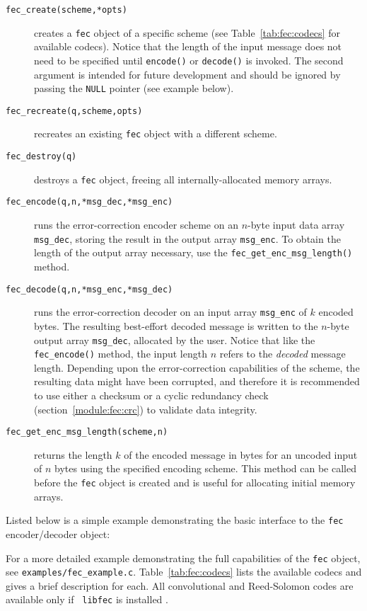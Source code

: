 \begin{description}
\item[{\tt fec\_create(scheme,*opts)}]
    creates a {\tt fec} object of a specific scheme
    (see Table~\ref{tab:fec:codecs} for available codecs).
    Notice that the length of the input message does not need to be
    specified until {\tt encode()} or {\tt decode()} is invoked.
    The second argument is intended for future development and should be
    ignored by passing the {\tt NULL} pointer
    (see example below).
\item[{\tt fec\_recreate(q,scheme,opts)}]
    recreates an existing {\tt fec} object with a different scheme.
\item[{\tt fec\_destroy(q)}]
    destroys a {\tt fec} object, freeing all internally-allocated memory
    arrays.
\item[{\tt fec\_encode(q,n,*msg\_dec,*msg\_enc)}]
    runs the error-correction encoder scheme on an $n$-byte input data
    array {\tt msg\_dec}, storing the result in the output array
    {\tt msg\_enc}.
    To obtain the length of the output array necessary, use the
    {\tt fec\_get\_enc\_msg\_length()} method.
\item[{\tt fec\_decode(q,n,*msg\_enc,*msg\_dec)}]
    runs the error-correction decoder on an input array
    {\tt msg\_enc} of $k$ encoded bytes.
    The resulting best-effort decoded message is written to the $n$-byte
    output array {\tt msg\_dec}, allocated by the user.
    Notice that like the {\tt fec\_encode()} method, the input length
    $n$ refers to the {\em decoded} message length.
    Depending upon the error-correction capabilities of the scheme, the
    resulting data might have been corrupted,
    and therefore it is recommended to use either a checksum or a
    cyclic redundancy check (section~\ref{module:fec:crc})
    to validate data integrity.
\item[{\tt fec\_get\_enc\_msg\_length(scheme,n)}]
    returns the length $k$ of the encoded message in bytes
    for an uncoded input of $n$ bytes using the specified encoding
    scheme.
    This method can be called before the {\tt fec} object is created and
    is useful for allocating initial memory arrays.
\end{description}
%
Listed below is a simple example demonstrating the basic interface to
the {\tt fec} encoder/decoder object:
%

%
For a more detailed example demonstrating the full capabilities of the
{\tt fec} object, see {\tt examples/fec\_example.c}.
%
Table~\ref{tab:fec:codecs} lists the available codecs and gives a brief
description for each.
All convolutional and Reed-Solomon codes are available only if {\tt
libfec} is installed \cite{libfec:web}.

